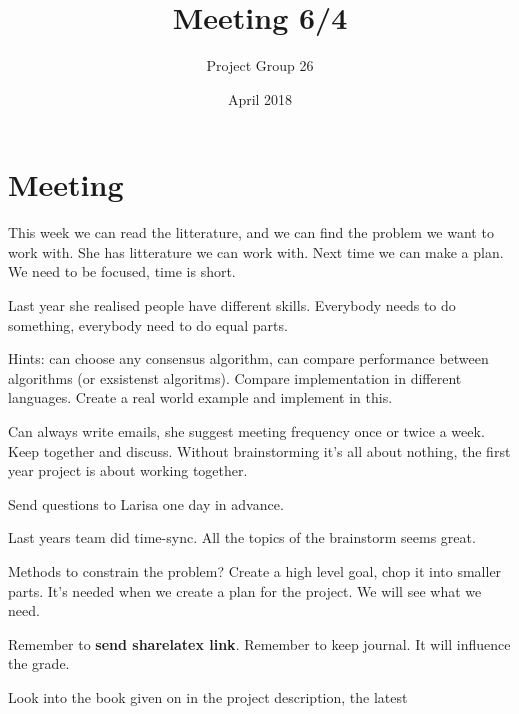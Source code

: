 \documentclass{article}
\title{Meeting 6/4}
\author{Project Group 26}
\date{April 2018}
\begin{document}
\maketitle

\section{Meeting}


This week  we can read the litterature, and we can find the problem we want to work with. She has litterature we can work with. Next time we can make a plan. We need to be focused, time is short. 

Last year she realised people have different skills. Everybody needs to do something, everybody need to do equal parts.

Hints: can choose any consensus algorithm, can compare performance between algorithms (or exsistenst algoritms). Compare implementation in different languages. Create a real world example and implement in this.

Can always write emails, she suggest meeting frequency once or twice a week. Keep together and discuss. Without brainstorming it's all about nothing, the first year project is about working together. 

Send questions to Larisa one day in advance. 

Last years team did time-sync. All the topics of the brainstorm seems great. 

Methods to constrain the problem? Create a high level goal, chop it into smaller parts. It's needed when we create a plan for the project. We will see what we need.

Remember to \textbf{send sharelatex link}. Remember to keep journal. It will influence the grade.

Look into the book given on in the project description, the latest 
\end{document}
